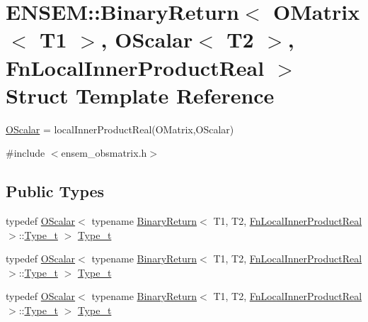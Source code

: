 \hypertarget{structENSEM_1_1BinaryReturn_3_01OMatrix_3_01T1_01_4_00_01OScalar_3_01T2_01_4_00_01FnLocalInnerProductReal_01_4}{}\section{E\+N\+S\+EM\+:\+:Binary\+Return$<$ O\+Matrix$<$ T1 $>$, O\+Scalar$<$ T2 $>$, Fn\+Local\+Inner\+Product\+Real $>$ Struct Template Reference}
\label{structENSEM_1_1BinaryReturn_3_01OMatrix_3_01T1_01_4_00_01OScalar_3_01T2_01_4_00_01FnLocalInnerProductReal_01_4}


\mbox{\hyperlink{classENSEM_1_1OScalar}{O\+Scalar}} = local\+Inner\+Product\+Real(\+O\+Matrix,\+O\+Scalar)  




{\ttfamily \#include $<$ensem\+\_\+obsmatrix.\+h$>$}

\subsection*{Public Types}
\begin{DoxyCompactItemize}
\item 
typedef \mbox{\hyperlink{classENSEM_1_1OScalar}{O\+Scalar}}$<$ typename \mbox{\hyperlink{structENSEM_1_1BinaryReturn}{Binary\+Return}}$<$ T1, T2, \mbox{\hyperlink{structENSEM_1_1FnLocalInnerProductReal}{Fn\+Local\+Inner\+Product\+Real}} $>$\+::\mbox{\hyperlink{structENSEM_1_1BinaryReturn_3_01OMatrix_3_01T1_01_4_00_01OScalar_3_01T2_01_4_00_01FnLocalInnerProductReal_01_4_a4dca9fd1aa942a0da9d64b937f1e7639}{Type\+\_\+t}} $>$ \mbox{\hyperlink{structENSEM_1_1BinaryReturn_3_01OMatrix_3_01T1_01_4_00_01OScalar_3_01T2_01_4_00_01FnLocalInnerProductReal_01_4_a4dca9fd1aa942a0da9d64b937f1e7639}{Type\+\_\+t}}
\item 
typedef \mbox{\hyperlink{classENSEM_1_1OScalar}{O\+Scalar}}$<$ typename \mbox{\hyperlink{structENSEM_1_1BinaryReturn}{Binary\+Return}}$<$ T1, T2, \mbox{\hyperlink{structENSEM_1_1FnLocalInnerProductReal}{Fn\+Local\+Inner\+Product\+Real}} $>$\+::\mbox{\hyperlink{structENSEM_1_1BinaryReturn_3_01OMatrix_3_01T1_01_4_00_01OScalar_3_01T2_01_4_00_01FnLocalInnerProductReal_01_4_a4dca9fd1aa942a0da9d64b937f1e7639}{Type\+\_\+t}} $>$ \mbox{\hyperlink{structENSEM_1_1BinaryReturn_3_01OMatrix_3_01T1_01_4_00_01OScalar_3_01T2_01_4_00_01FnLocalInnerProductReal_01_4_a4dca9fd1aa942a0da9d64b937f1e7639}{Type\+\_\+t}}
\item 
typedef \mbox{\hyperlink{classENSEM_1_1OScalar}{O\+Scalar}}$<$ typename \mbox{\hyperlink{structENSEM_1_1BinaryReturn}{Binary\+Return}}$<$ T1, T2, \mbox{\hyperlink{structENSEM_1_1FnLocalInnerProductReal}{Fn\+Local\+Inner\+Product\+Real}} $>$\+::\mbox{\hyperlink{structENSEM_1_1BinaryReturn_3_01OMatrix_3_01T1_01_4_00_01OScalar_3_01T2_01_4_00_01FnLocalInnerProductReal_01_4_a4dca9fd1aa942a0da9d64b937f1e7639}{Type\+\_\+t}} $>$ \mbox{\hyperlink{structENSEM_1_1BinaryReturn_3_01OMatrix_3_01T1_01_4_00_01OScalar_3_01T2_01_4_00_01FnLocalInnerProductReal_01_4_a4dca9fd1aa942a0da9d64b937f1e7639}{Type\+\_\+t}}
\end{DoxyCompactItemize}


